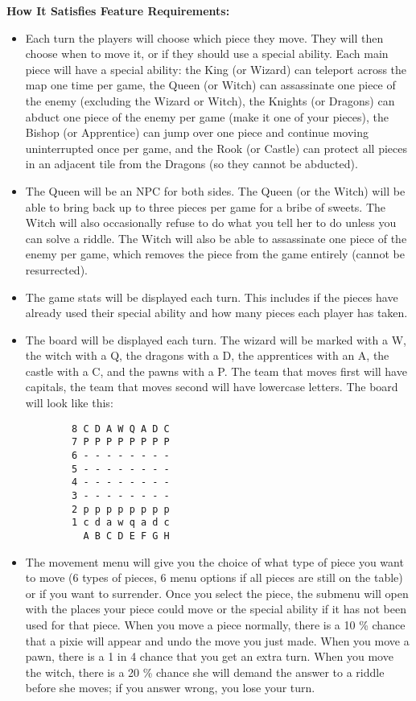 \textbf{How It Satisfies Feature Requirements:}
\begin{itemize}
    \item Each turn the players will choose which piece they move. They will then choose when to move it, or if they should use a special ability. Each main piece will have a special ability: the King (or Wizard) can teleport across the map one time per game, the Queen (or Witch) can assassinate one piece of the enemy (excluding the Wizard or Witch), the Knights (or Dragons) can abduct one piece of the enemy per game (make it one of your pieces), the Bishop (or Apprentice) can jump over one piece and continue moving uninterrupted once per game, and the Rook (or Castle) can protect all pieces in an adjacent tile from the Dragons (so they cannot be abducted). 
    \item The Queen will be an NPC for both sides. The Queen (or the Witch) will be able to bring back up to three pieces per game for a bribe of sweets. The Witch will also occasionally refuse to do what you tell her to do unless you can solve a riddle. The Witch will also be able to assassinate one piece of the enemy per game, which removes the piece from the game entirely (cannot be resurrected). 
    \item The game stats will be displayed each turn. This includes if the pieces have already used their special ability and how many pieces each player has taken.
    \item The board will be displayed each turn. The wizard will be marked with a W, the witch with a Q, the dragons with a D, the apprentices with an A, the castle with a C, and the pawns with a P. The team that moves first will have capitals, the team that moves second will have lowercase letters. The board will look like this:
    \begin{verbatim}
        8 C D A W Q A D C
        7 P P P P P P P P
        6 - - - - - - - -
        5 - - - - - - - -
        4 - - - - - - - -
        3 - - - - - - - -
        2 p p p p p p p p
        1 c d a w q a d c
          A B C D E F G H
    \end{verbatim}
    \item The movement menu will give you the choice of what type of piece you want to move (6 types of pieces, 6 menu options if all pieces are still on the table) or if you want to surrender. Once you select the piece, the submenu will open with the places your piece could move or the special ability if it has not been used for that piece. When you move a piece normally, there is a 10 \% chance that a pixie will appear and undo the move you just made. When you move a pawn, there is a 1 in 4 chance that you get an extra turn. When you move the witch, there is a 20 \% chance she will demand the answer to a riddle before she moves; if you answer wrong, you lose your turn.
\end{itemize}

